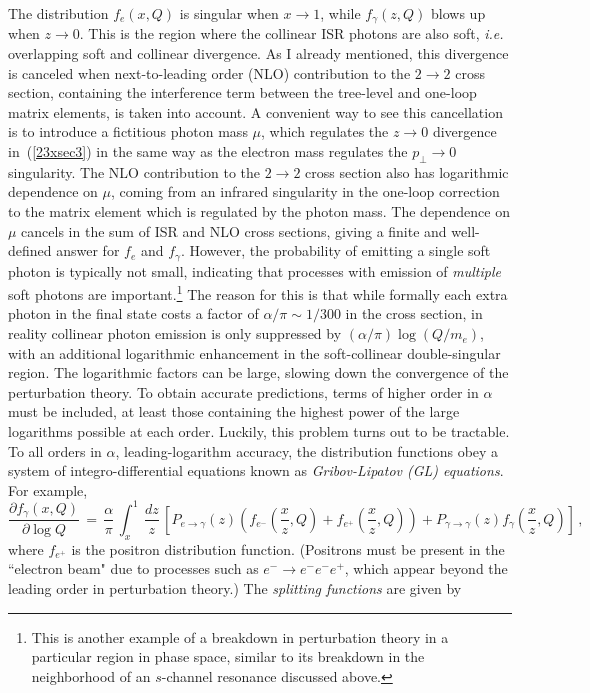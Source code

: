 \documentclass{ws-procs9x6}
\def\beq{\begin{equation}}
\def\eeq#1{\label{#1}\end{equation}}
\def\leqn#1{(\ref{#1})}
\begin{document}
The distribution $f_e(x,Q)$ is singular when $x\to 1$, while $f_\gamma(z,Q)$ blows up when $z\to 0$. This is the region where the collinear ISR photons are also soft, {\it i.e.} overlapping soft and collinear divergence. As I already mentioned, this divergence is canceled when next-to-leading order (NLO) contribution to the $2\to 2$ cross section, containing the interference term between the tree-level and one-loop matrix elements, is taken into account. A convenient way to see this cancellation is to introduce a fictitious photon mass $\mu$, which regulates the $z\to 0$ divergence in~\leqn{23xsec3} in the same way as the electron mass regulates the $p_\perp\to 0$ singularity. The NLO contribution to the $2\to 2$ cross section also has logarithmic dependence on $\mu$, coming from an infrared singularity in the one-loop correction to the matrix element which is regulated by the photon mass. The dependence on $\mu$ cancels in the sum of ISR and NLO cross sections, giving a finite and well-defined answer for $f_e$ and $f_\gamma$. However, the probability of emitting a single soft photon is typically not small, indicating that processes with emission of {\it multiple} soft photons are important.\footnote{This is another example of a breakdown in perturbation theory in a particular region in phase space, similar to its breakdown in the neighborhood of an $s$-channel resonance discussed above.} The reason for this is that while formally each extra photon in the final state costs a factor of $\alpha/\pi \sim 1/300$ in the cross section, in reality collinear photon emission is only suppressed by 
$(\alpha/\pi)\log(Q/m_e)$, with an additional logarithmic enhancement in the soft-collinear double-singular region. The logarithmic factors can be large, slowing down the convergence of the perturbation theory. 
To obtain accurate predictions, terms of higher order in $\alpha$ must be included, at least those containing the highest power of the large logarithms possible at each order. Luckily, this problem turns out to be tractable. To all orders in $\alpha$, leading-logarithm accuracy, the distribution functions obey a system of integro-differential equations known as {\it Gribov-Lipatov (GL) equations}. For example,
\beq
\frac{\partial f_\gamma(x,Q)}{\partial\log Q}\,=\,\frac{\alpha}{\pi}\,
\int_x^1 \,\frac{dz}{z} \,\left[ P_{e\to\gamma}(z) \left( f_{e^-}\left(\frac{x}{z},Q\right) + f_{e^+}\left(\frac{x}{z},Q\right)\right)
+ P_{\gamma\to\gamma}(z) f_\gamma\left(\frac{x}{z},Q\right)\right]\,,
\eeq{GL} 
where $f_{e^+}$ is the positron distribution function. (Positrons must be present in the ``electron beam" due to processes such as $e^-\to e^-e^-e^+$, which appear beyond the leading order in perturbation theory.) The {\it splitting functions} are given by
\end{document}
